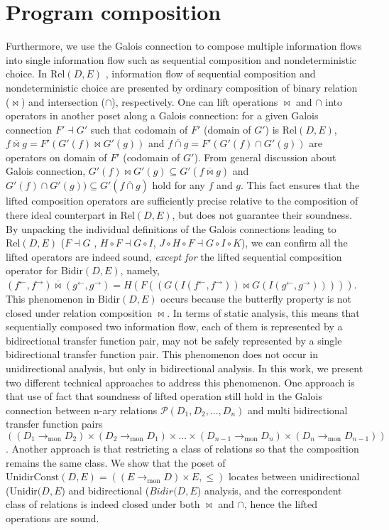 \documentclass{easychair}
\theoremstyle{definition}
\newcommand{\Pow}{\mathcal{P}}
\newcommand{\Rel}{\mathrm{Rel}}
\newcommand{\Bidir}{\mathrm{Bidir}}
\newcommand{\Unidir}{\mathrm{Unidir}}
\newcommand{\UnidirConst}{\mathrm{UnidirConst}}
\newcommand{\tomon}{\to_{\mathrm{mon}}}
\newcommand{\ff}{{f^{\rightarrow}}}
\newcommand{\fb}{{f^{\leftarrow}}}
\newcommand{\gf}{{g^{\rightarrow}}}
\newcommand{\gb}{{g^{\leftarrow}}}
\newcommand{\comp}{\circ}
\newcommand{\bowtielift}{\mathbin{\overline{\bowtie}}}
\newcommand{\caplift}{\mathbin{\overline{\cap}}}
\begin{document}
\section{Program composition}
Furthermore, we use the Galois connection to compose multiple information flows into single
information flow such as sequential composition and nondeterministic choice. In $\Rel(D, E)$ ,
information flow of sequential composition and nondeterministic choice are presented by ordinary composition of binary relation ($\bowtie$) and intersection ($\cap$), respectively. One can lift operations $\bowtie$ and $\cap$
into operators in another poset along a Galois connection: for a given Galois connection $F' \dashv G'$ such that codomain of $F'$ (domain of $G'$) is $\Rel(D, E)$, $f \bowtielift g = F'(G'(f) \bowtie G'(g))$ and $f \caplift g = F'(G'(f) \cap G'(g))$ are operators on domain of $F'$ (codomain of $G'$).
From general discussion about Galois connection,
$G'(f) \bowtie G'(g) \subseteq G' (f \bowtielift g)$ and $G'(f) \cap G'(g)) \subseteq G'(f \caplift g)$ hold for any $f$ and $g$.
This fact ensures that the lifted composition operators are sufficiently precise relative to the composition of there ideal counterpart in $\Rel(D, E)$, but does not guarantee their soundness.
By unpacking the individual definitions of the Galois connections leading to $\Rel(D ,E)$ ($F \dashv G$ , $H \comp F \dashv G \comp I$, $J \comp H \comp F \dashv G \comp I \comp K$), we can confirm all the lifted operators are indeed sound, \emph{except for} the lifted sequential composition operator for $\Bidir(D, E)$, namely, $(\fb , \ff) \bowtielift (\gb , \gf) = H(F((G(I(\fb , \ff)) \bowtie G(I(\gb , \gf)))))$. This phenomenon in $\Bidir(D, E)$ occurs because the butterfly property is not closed under relation composition $\bowtie$.
In terms of static analysis, this means that sequentially composed two information flow, each of them is represented by a bidirectional transfer function pair, may not be safely represented by a single bidirectional transfer function pair. This phenomenon does not occur in unidirectional analysis, but only in bidirectional analysis.
In this work, we present two different technical approaches to address this phenomenon.
One approach is that use of fact that soundness of lifted operation still hold in the Galois connection between n-ary relations $\Pow(D_{1}, D_{2}, ... , D_{n})$ and multi bidirectional transfer function pairs $((D_{1} \tomon D_{2}) \times (D_{2} \tomon D_{1}) \times ... \times (D_{n-1} \tomon D_{n}) \times (D_{n} \tomon D_{n-1}))$.
Another approach is that restricting a class of relations so that the composition remains the same class. We show that the poset of $\UnidirConst(D, E) = ((E \tomon D) \times E, \leq)$ locates between unidirectional ($\Unidir(D , E$) and bidirectional ($Bidir(D, E$) analysis, and the correspondent class of relations is indeed closed under both $\bowtie$ and $\cap$, hence the lifted operations are sound.
\end{document}
